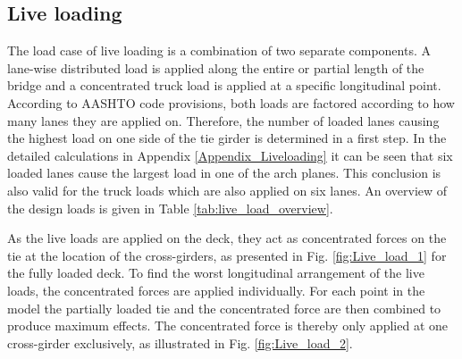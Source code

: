 \subsection{Live loading} \label{sec:met_loads_live}
The load case of live loading is a combination of two separate components. A lane-wise distributed load is applied along the entire or partial length of the bridge and a concentrated truck load is applied at a specific longitudinal point. According to AASHTO code provisions, both loads are factored according to how many lanes they are applied on. Therefore, the number of loaded lanes causing the highest load on one side of the tie girder is determined in a first step. In the detailed calculations in Appendix \ref{Appendix_Liveloading} it can be seen that six loaded lanes cause the largest load in one of the arch planes. This conclusion is also valid for the truck loads which are also applied on six lanes. An overview of the design loads is given in Table \ref{tab:live_load_overview}. 



As the live loads are applied on the deck, they act as concentrated forces on the tie at the location of the cross-girders, as presented in Fig. \ref{fig:Live_load_1} for the fully loaded deck. To find the worst longitudinal arrangement of the live loads, the concentrated forces are applied individually. For each point in the model the partially loaded tie and the concentrated force are then combined to produce maximum effects. The concentrated force is thereby only applied at one cross-girder exclusively, as illustrated in Fig. \ref{fig:Live_load_2}. 


